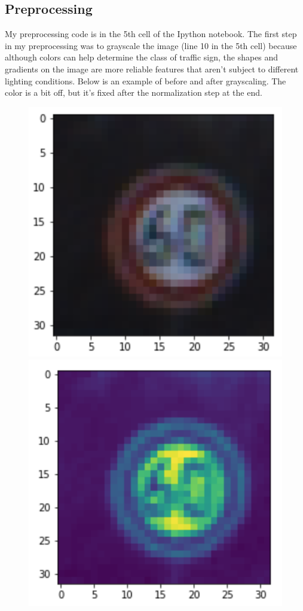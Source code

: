 \documentclass[12pt]{article}
\begin{document}
\subsection{Preprocessing}
My preprocessing code is in the 5th cell of the Ipython notebook. The first step in my preprocessing was to grayscale the image (line 10 in the 5th cell) because although colors can help determine the class of traffic sign, the shapes and gradients on the image are more reliable features that aren't subject to different lighting conditions. Below is an example of before and after grayscaling. The color is a bit off, but it's fixed after the normalization step at the end.
\begin{figure}[H]
\centering
\includegraphics[scale = 0.5]{writeup_images/im1.png}
\includegraphics[scale = 0.5]{writeup_images/grayscale.png}
\end{figure}
\end{document}
